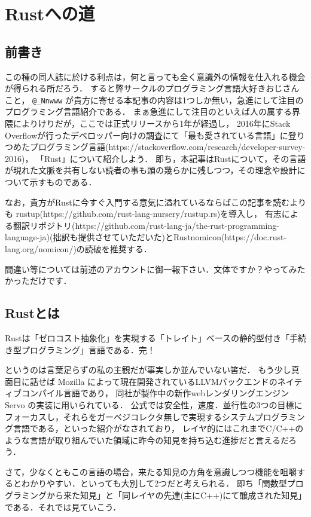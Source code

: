 \chapter{Rustへの道}

\section{前書き}
この種の同人誌に於ける利点は，何と言っても全く意識外の情報を仕入れる機会が得られる所だろう．
すると弊サークルのプログラミング言語大好きおじさんこと， \verb|@_Nnwww| が貴方に寄せる本記事の内容は1つしか無い，急進にして注目のプログラミング言語紹介である．
まぁ急進にして注目のといえば人の属する界隈によりけりだが，ここでは正式リリースから1年が経過し，
2016年にStack Overflowが行ったデベロッパー向けの調査にて「最も愛されている言語」に登りつめたプログラミング言語(https://stackoverflow.com/research/developer-survey-2016)，
「Rust」について紹介しよう．
即ち，本記事はRustについて，その言語が現れた文脈を共有しない読者の事も頭の幾らかに残しつつ，その理念や設計について示すものである．

なお，貴方がRustに今すぐ入門する意気に溢れているならばこの記事を読むよりも
rustup(https://github.com/rust-lang-nursery/rustup.rs)を導入し，
有志による翻訳リポジトリ(https://github.com/rust-lang-ja/the-rust-programming-language-ja)(拙訳も提供させていただいた)とRustnomicon(https://doc.rust-lang.org/nomicon/)の読破を推奨する．

間違い等については前述のアカウントに御一報下さい．文体ですか？やってみたかっただけです．

\section{Rustとは}
Rustは「ゼロコスト抽象化」を実現する「トレイト」ベースの静的型付き「手続き型プログラミング」言語である．完！

というのは言葉足らずの私の主観だが事実しか並んでいない筈だ．
もう少し真面目に話せば Mozilla によって現在開発されているLLVMバックエンドのネイティブコンパイル言語であり，
同社が製作中の新作webレンダリングエンジン Servo の実装に用いられている．
公式では安全性，速度．並行性の3つの目標にフォーカスし，それらをガーベジコレクタ無しで実現するシステムプログラミング言語である，といった紹介がなされており，
レイヤ的にはこれまでC/C++のような言語が取り組んでいた領域に昨今の知見を持ち込む進捗だと言えるだろう．

さて，少なくともこの言語の場合，来たる知見の方角を意識しつつ機能を咀嚼するとわかりやすい．といっても大別して2つだと考えられる．
即ち「関数型プログラミングから来た知見」と「同レイヤの先達(主にC++)にて醸成された知見」である．それでは見ていこう．

